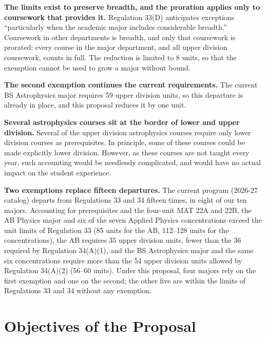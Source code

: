 \documentclass[12pt]{article}
\begin{document}
\vskip 0.1in
\noindent
{\bf The limits exist to preserve breadth, and the proration applies
  only to coursework that provides it.}  Regulation 33(D) anticipates
exceptions ``particularly when the academic major includes
considerable breadth.''  Coursework in other departments is breadth,
and only that coursework is prorated:  every course in the major
department, and all upper division coursework, counts in full.  The
reduction is limited to 8 units, so that the exemption cannot be used
to grow a major without bound.

\vskip 0.1in
\noindent
{\bf The second exemption continues the current requirements.}  The
current BS Astrophysics major requires 59 upper division units, so
this departure is already in place, and this proposal reduces it by
one unit.

\vskip 0.1in
\noindent
{\bf Several astrophysics courses sit at the border of lower and upper
  division.}  Several of the upper division astrophysics courses
require only lower division courses as prerequisites.  In principle,
some of these courses could be made explicitly lower division.
However, as these courses are not taught every year, such accounting
would be needlessly complicated, and would have no actual impact on
the student experience.

\vskip 0.1in
\noindent
{\bf Two exemptions replace fifteen departures.}  The current program
(2026-27 catalog) departs from Regulations 33 and 34 fifteen times, in
eight of our ten majors.  Accounting for prerequisites and the
four-unit MAT 22A and 22B, the AB Physics major and six of the seven
Applied Physics concentrations exceed the unit limits of Regulation
33 (85 units for the AB, 112--128 units for the concentrations), the
AB requires 35 upper division units, fewer than the 36 required by
Regulation 34(A)(1), and the BS Astrophysics major and the same six
concentrations require more than the 54 upper division units allowed
by Regulation 34(A)(2) (56--60 units).  Under this proposal, four
majors rely on the first exemption and one on the second;  the other
five are within the limits of Regulations 33 and 34 without any
exemption.

\newpage

\section{Objectives of the Proposal}
\end{document}
